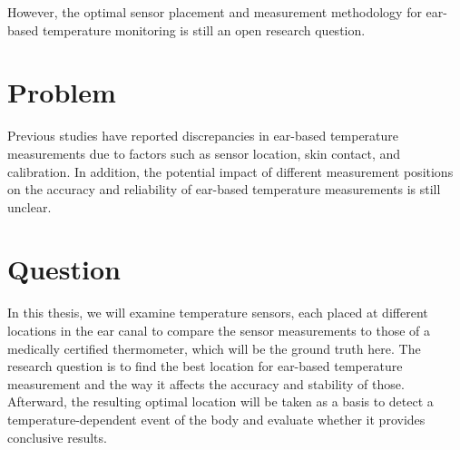 However, the optimal sensor placement and measurement methodology for ear-based temperature monitoring is still an open research question. 

\section{Problem}
Previous studies have reported discrepancies in ear-based temperature measurements due to factors such as sensor location, skin contact, and calibration. In addition, the potential impact of different measurement positions on the accuracy and reliability of ear-based temperature measurements is still unclear.


\section{Question}
In this thesis, we will examine temperature sensors, each placed at different locations in the ear canal to compare the sensor measurements to those of a medically certified thermometer, which will be the ground truth here. The research question is to find the best location for ear-based temperature measurement and the way it affects the accuracy and stability of those. Afterward, the resulting optimal location will be taken as a basis to detect a temperature-dependent event of the body and evaluate whether it provides conclusive results.

